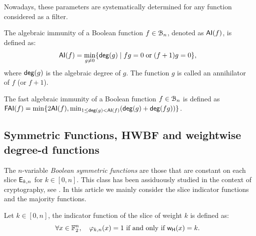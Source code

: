 \documentclass[11pt]{llncs}
\begin{document}
Nowadays, these parameters are systematically determined for any function considered as a filter.



\begin{definition} \label{def:ai}
	The algebraic immunity of a Boolean function $f\in \mathcal{B}_{n}$, denoted as $\mathsf{AI}(f)$, is defined as:
	\[ \mathsf{AI}(f) = \min_{g \neq 0}\{ \mathsf{deg}(g) \; | \; fg = 0 \; \text{or} \; (f + 1)g = 0 \}{,} \]
	where $\mathsf{deg}(g)$ is the algebraic degree of $g$.
	The function $g$ is called an annihilator of $f$ (or $f + 1$). 
\end{definition}



\begin{definition}\label{def:fai} The fast algebraic immunity of a Boolean function $f\in \mathcal{B}_{n}$ is defined as $\mathsf{FAI}(f)=\min \{ 2 \mathsf{AI}(f), \min _{1 \le \mathsf{deg}(g)<\mathsf{AI}(f)} (\mathsf{deg}(g)+ \mathsf{deg}(fg))\}$.
\end{definition}
	





\subsection{Symmetric Functions, HWBF and weightwise degree-d functions}




The $n$-variable \emph{Boolean symmetric functions} are those that are constant on each slice $\mathsf{E}_{k,n}$ for $k\in [0,n]$. 
This class has been assiduously studied in the context of cryptography, see \eg \cite{IEEE:Carlet04,IEEE:CanVid05,INDO:BraPre05,DM:SarMai07,IEEE:QFLW09,IEEE:CheLu11,Latin:Meaux19,CCDS:Meaux21,IEEE:CarMea21}.
In this article we mainly consider the slice indicator functions and the majority functions.
\begin{definition}\label{def:slice}
 Let $k\in [0,n]$, the indicator function of the slice of weight $k$ is defined as:
 \[\forall  x\in \mathbb{F}_2^{n}, \quad \varphi_{k,n}(x) = 1 \text{ if and only if } \mathsf{w_H}(x) = k.\]
\end{definition}
\end{document}
